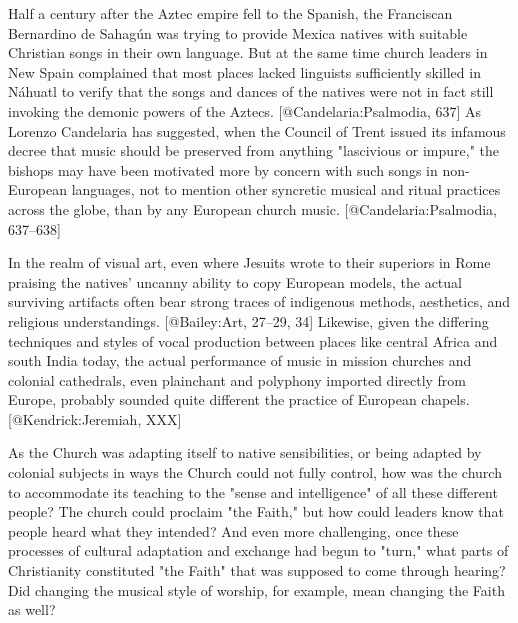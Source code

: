 Half a century after the Aztec empire fell to the Spanish, the Franciscan
Bernardino de Sahagún was trying to provide Mexica natives with suitable
Christian songs in their own language. 
But at the same time church leaders in New Spain complained that most places
lacked linguists sufficiently skilled in Náhuatl to verify that the songs and
dances of the natives were not in fact still invoking the demonic powers of the
Aztecs. 
[@Candelaria:Psalmodia, 637]
As Lorenzo Candelaria has suggested, when the Council of Trent issued its
infamous decree that music should be preserved from anything "lascivious or
impure," the bishops may have been motivated more by concern with such songs in
non-European languages, not to mention other syncretic musical and ritual
practices across the globe, than by any European church music.
[@Candelaria:Psalmodia, 637--638]

In the realm of visual art, even where Jesuits wrote to their superiors in Rome
praising the natives' uncanny ability to copy European models, the actual
surviving artifacts often bear strong traces of indigenous methods, aesthetics,
and religious understandings.
[@Bailey:Art, 27--29, 34]
Likewise, given the differing techniques and styles of vocal production between
places like central Africa and south India today, the actual performance of
music in mission churches and colonial cathedrals, even plainchant and polyphony
imported directly from Europe, probably sounded quite different the practice of
European chapels. 
[@Kendrick:Jeremiah, XXX] %

As the Church was adapting itself to native sensibilities, or being adapted by
colonial subjects in ways the Church could not fully control, how was the church
to accommodate its teaching to the "sense and intelligence" of all these
different people? 
The church could proclaim "the Faith," but how could leaders know that people
heard what they intended? 
And even more challenging, once these processes of cultural adaptation and
exchange had begun to "turn," what parts of Christianity constituted "the Faith"
that was supposed to come through hearing? 
Did changing the musical style of worship, for example, mean changing the Faith
as well?

